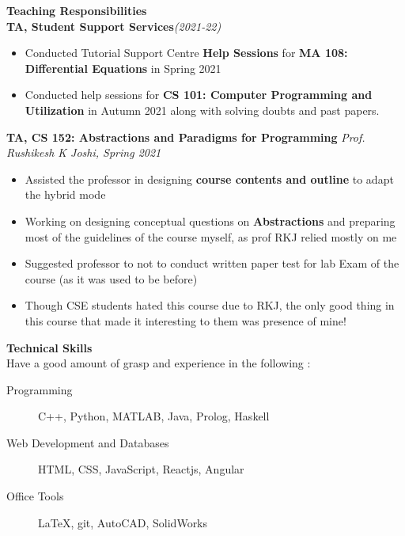 \documentclass[]{article}
\begin{document}
\textcolor{blue!60!black}{\Large \textbf{Teaching Responsibilities}}
\vspace{1 em}\\
\textbf{TA, Student Support Services}\hfill\textit{\small (2021-22)}
\begin{itemize}
    \item Conducted Tutorial Support Centre \textbf{Help Sessions} for \textbf{MA 108: Differential Equations} in Spring 2021
    \item Conducted help sessions for \textbf{CS 101: Computer Programming and Utilization} in Autumn 2021 along with solving doubts and past papers.
\end{itemize}
\textbf{TA, CS 152: Abstractions and Paradigms for Programming}
\hfill\textit{\small Prof. Rushikesh K Joshi, Spring 2021}
\begin{itemize}
    \item Assisted the professor in designing \textbf{course contents and outline} to adapt the hybrid mode
    \item Working on designing conceptual questions on \textbf{Abstractions} and preparing most of the guidelines of the course myself, as prof RKJ relied mostly on me
    \item Suggested professor to not to conduct written paper test for lab Exam of the course (as it was used to be before)
    \item Though CSE students hated this course due to RKJ, the only good thing in this course that made it interesting to them was presence of mine!
\end{itemize}
\vspace{1.25 em}

\textcolor{blue!60!black}{\Large \textbf{Technical Skills}}
\vspace{1 em}\\
Have a good amount of grasp and experience in the following :
\begin{description}
\item[Programming] C++, Python, MATLAB, Java, Prolog, Haskell
\item[Web Development and Databases] HTML, CSS, JavaScript, Reactjs, Angular
\item[Office Tools] \LaTeX, git, AutoCAD, SolidWorks
\end{description}
\vspace{1.25 em}
\end{document}
